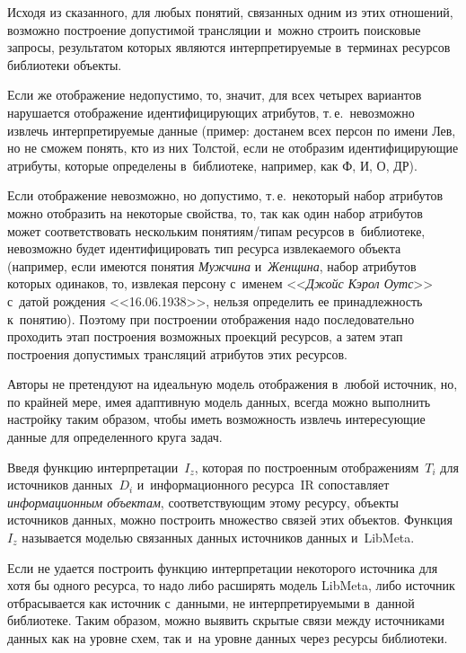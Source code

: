 \begin{multicols}{2}
    Исходя из сказанного, для любых понятий, связанных одним из этих 
отношений, возможно построение допустимой трансляции и~можно строить 
поисковые запросы, результатом которых являются интерпретируемые 
в~терминах ресурсов библиотеки объекты.


    
    Если же отображение недопустимо, то, значит, для всех четырех 
вариантов нарушается отображение идентифицирующих атрибутов, т.\,е.\ 
невозможно извлечь интерпретируемые данные (пример: достанем всех 
персон по имени Лев, но не сможем понять, кто из них Толстой, если не 
отобразим идентифицирующие атрибуты, которые определены в~библиотеке, 
например, как Ф, И, О, ДР). 
    
    Если отображение невозможно, но допустимо, т.\,е.\ некоторый набор 
атрибутов можно отобразить на некоторые свойства, то, так как один набор 
атрибутов может соответствовать нескольким по\-ня\-ти\-ям/ти\-пам ресурсов 
в~библиотеке, невозможно будет идентифицировать тип ресурса 
извлекаемого объекта (например, если имеются понятия \textit{Мужчина} 
и~\textit{Женщина}, набор атрибутов которых одинаков, то, извлекая персону 
с~именем <<\textit{Джойс Кэрол Оутс}>> с~датой рождения 
<<16.06.1938>>, нельзя определить ее принадлежность к~понятию). Поэтому 
при построении отображения надо последовательно проходить этап 
построения возможных проекций ресурсов, а затем этап построения 
допустимых трансляций атрибутов этих ресурсов.
    
    Авторы не претендуют на идеальную модель отоб\-ра\-же\-ния в~любой 
источник, но, по крайней мере, имея адаптивную модель данных, всегда 
можно выполнить настройку таким образом, чтобы иметь возможность 
извлечь интересующие данные для определенного круга задач.
    
    Введя функцию интерпретации~$I_z$, которая по построенным 
отображениям~$T_i$ для источников данных~$D_i$ и~информационного 
ресурса~$\mathrm{IR}$ сопоставляет \textit{информационным объектам}, 
со\-от\-вет\-ст\-ву\-ющим этому ресурсу, объекты источников данных, можно 
построить множество связей этих объектов. Функция~$I_z$ называется 
моделью связанных данных источников данных и~LibMeta. 

Если не удается 
построить функцию интерпретации некоторого источника для хотя бы 
одного ресурса, то надо либо расширять модель LibMeta, либо источник 
отбрасывается как источник с~данными, не интерпретируемыми в~данной 
библиотеке. Таким образом, можно выявить скрытые связи между 
источниками данных как на уровне схем, так и~на уровне данных через 
ресурсы библио\-теки. 
{

}
\end{multicols}
